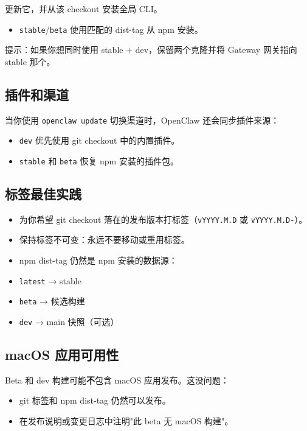 更新它，并从该 checkout 安装全局 CLI。
\begin{itemize}
  \item \texttt{stable}/\texttt{beta} 使用匹配的 dist-tag 从 npm 安装。
\end{itemize}


提示：如果你想同时使用 stable + dev，保留两个克隆并将 Gateway 网关指向 stable 那个。

\subsection{插件和渠道}


当你使用 \texttt{openclaw update} 切换渠道时，OpenClaw 还会同步插件来源：

\begin{itemize}
  \item \texttt{dev} 优先使用 git checkout 中的内置插件。
  \item \texttt{stable} 和 \texttt{beta} 恢复 npm 安装的插件包。
\end{itemize}


\subsection{标签最佳实践}


\begin{itemize}
  \item 为你希望 git checkout 落在的发布版本打标签（\texttt{vYYYY.M.D} 或 \texttt{vYYYY.M.D-}）。
  \item 保持标签不可变：永远不要移动或重用标签。
  \item npm dist-tag 仍然是 npm 安装的数据源：
  \item \texttt{latest} → stable
  \item \texttt{beta} → 候选构建
  \item \texttt{dev} → main 快照（可选）
\end{itemize}


\subsection{macOS 应用可用性}


Beta 和 dev 构建可能\textbf{不}包含 macOS 应用发布。这没问题：

\begin{itemize}
  \item git 标签和 npm dist-tag 仍然可以发布。
  \item 在发布说明或变更日志中注明"此 beta 无 macOS 构建"。
\end{itemize}



